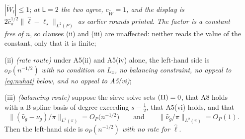 \begin{lemma}
\begin{enumerate}
$|\widetilde W_l|\le1$; \emph{at $\mathsf L=2$ the two agree, $c_{\widetilde W}=1$, and the
display is $2\bar c_\pi^{1/2}\|\hat\ell-\ell_\star\|_{L^{2}(P)}$ as earlier rounds printed}. \emph{The
factor is a constant free of $n$}, so clauses \textup{(ii)} and \textup{(iii)} are unaffected: neither
reads the value of the constant, only that it is finite;
\item[(ii)] \emph{(rate route)} under A5(ii) and A5(iv) alone, the left-hand side is $o_P(n^{-1/2})$
\emph{with no condition on $L_x$, no balancing constraint, no appeal to \eqref{eq:nuhat} below, and no
appeal to A5(vi)};
\item[(iii)] \emph{(balancing route)} suppose the sieve solve sets $\text{\rm(II)}=0$, that A8 holds with
a B-spline basis of degree exceeding $s-\tfrac12$, that A5(vi) holds, and that
\begin{equation}\label{eq:nuhat}
\big\|(\hat\nu_g-\nu_g)/\pi\big\|_{L^{2}(\pi)}=O_P\big(n^{-1/2}\big)
\qquad\text{and}\qquad
\big\|\hat\nu_g/\pi\big\|_{L^{2}(\pi)}=O_P(1).
\end{equation}
Then the left-hand side is $o_P(n^{-1/2})$ \emph{with no rate for $\hat\ell$}.
\end{enumerate}
\end{lemma}


